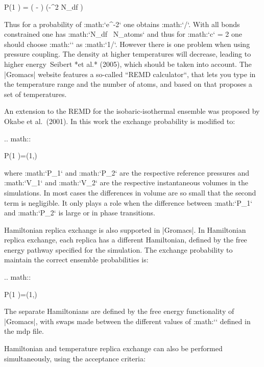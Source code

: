    P(1 )
     = \exp\left( - \right)
   \approx \exp\left(-\epsilon^2  N_{df} \right)

Thus for a probability of :math:`e^{-2}` one obtains
:math:`\epsilon {}/`. With all bonds constrained
one has :math:`N_{df} \, N_{atoms}` and thus for :math:`c` = 2
one should choose :math:`\epsilon` as :math:`1/`.
However there is one problem when using pressure coupling. The density
at higher temperatures will decrease, leading to higher energy Seibert
*et al.* (2005), which should be taken into account. The |Gromacs| website
features a so-called ``REMD calculator``, that lets you type in the
temperature range and the number of atoms, and based on that proposes a
set of temperatures.

An extension to the REMD for the isobaric-isothermal ensemble was
proposed by Okabe et al. (2001). In this work the
exchange probability is modified to:

.. math::

   P(1 )=\min\left(1,\exp{} \right)

where :math:`P_1` and :math:`P_2` are the respective reference
pressures and :math:`V_1` and :math:`V_2` are the respective
instantaneous volumes in the simulations. In most cases the differences
in volume are so small that the second term is negligible. It only plays
a role when the difference between :math:`P_1` and :math:`P_2` is large
or in phase transitions.

Hamiltonian replica exchange is also supported in |Gromacs|. In
Hamiltonian replica exchange, each replica has a different Hamiltonian,
defined by the free energy pathway specified for the simulation. The
exchange probability to maintain the correct ensemble probabilities is:

.. math::

   P(1 )=\min\left(1,\exp{}
   \right)

The separate Hamiltonians are defined by the free energy functionality
of |Gromacs|, with swaps made between the different values of
:math:`\lambda` defined in the mdp file.

Hamiltonian and temperature replica exchange can also be performed
simultaneously, using the acceptance criteria:

